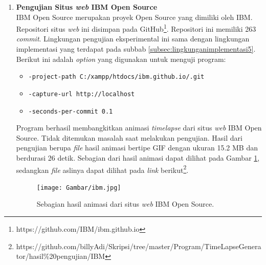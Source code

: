 \begin{enumerate}
\item \textbf{Pengujian Situs \textit{web} IBM Open Source}\\
IBM Open Source merupakan proyek Open Source yang dimiliki oleh IBM. Repositori situs \textit{web} ini disimpan pada GitHub\footnote{https://github.com/IBM/ibm.github.io}. Repositori ini memiliki 263 \textit{commit}. Lingkungan pengujian eksperimental ini sama dengan lingkungan implementasi yang terdapat pada subbab \ref{subsec:lingkunganimplementasi5}. Berikut ini adalah \textit{option} yang digunakan untuk menguji program:
\begin{itemize}
\item \texttt{-project-path C:/xampp/htdocs/ibm.github.io/.git}
\item \texttt{-capture-url http://localhost}
\item \texttt{-seconds-per-commit 0.1} 
\end{itemize}
Program berhasil membangkitkan animasi \textit{timelapse} dari situs \textit{web} IBM Open Source. Tidak ditemukan masalah saat melakukan pengujian. Hasil dari pengujian berupa \textit{file} hasil animasi bertipe GIF dengan ukuran 15.2 MB dan berdurasi 26 detik. Sebagian dari hasil animasi dapat dilihat pada Gambar \ref{fig:hasil_ibm}, sedangkan \textit{file} aslinya dapat dilihat pada \textit{link} berikut\footnote{https://github.com/billyAdi/Skripsi/tree/master/Program/TimeLapseGenerator/hasil\%20pengujian/IBM}.



\begin{figure}[H]	
		\texttt{[image: Gambar/ibm.jpg]}
	\caption{Sebagian hasil animasi dari situs \textit{web} IBM Open Source.}
	\label{fig:hasil_ibm}
\end{figure}



\end{enumerate}
